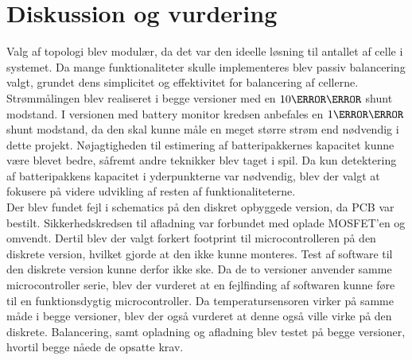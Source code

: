 \chapter{Diskussion og vurdering}\label{kap:diskussion}
Valg af topologi blev modulær, da det var den ideelle løsning til antallet af celle i systemet. Da mange funktionaliteter skulle implementeres blev passiv balancering valgt, grundet dens simplicitet og effektivitet for balancering af cellerne.
\\

Strømmålingen blev realiseret i begge versioner med en $10\milli\ohm$ shunt modstand. I versionen med battery monitor kredsen anbefales en $1\milli\ohm$ shunt modstand, da den skal kunne måle en meget større strøm end nødvendig i dette projekt. Nøjagtigheden til estimering af batteripakkernes kapacitet kunne være blevet bedre, såfremt andre teknikker blev taget i spil. Da kun detektering af batteripakkens kapacitet i yderpunkterne var nødvendig, blev der valgt at fokusere på videre udvikling af resten af funktionaliteterne.
\\

Der blev fundet fejl i schematics på den diskret opbyggede version, da PCB var bestilt. Sikkerhedskredsen til afladning var forbundet med oplade MOSFET'en og omvendt. Dertil blev der valgt forkert footprint til microcontrolleren på den diskrete version, hvilket gjorde at den ikke kunne monteres. Test af software til den diskrete version kunne derfor ikke ske. Da de to versioner anvender samme microcontroller serie, blev der vurderet at en fejlfinding af softwaren kunne føre til en funktionsdygtig microcontroller. Da temperatursensoren virker på samme måde i begge versioner, blev der også vurderet at denne også ville virke på den diskrete. Balancering, samt opladning og afladning blev testet på begge versioner, hvortil begge nåede de opsatte krav.
